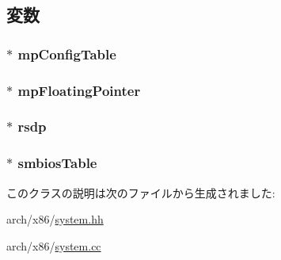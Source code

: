 \subsection{変数}
\hypertarget{classX86System_a9330926e79494dca3485ba60e2fe27d4}{
\subsubsection[{mpConfigTable}]{$\ast$ {\bf mpConfigTable}}}
\label{classX86System_a9330926e79494dca3485ba60e2fe27d4}
\hypertarget{classX86System_ae6f1d27ec00245a1760fbadd3c288f27}{
\subsubsection[{mpFloatingPointer}]{$\ast$ {\bf mpFloatingPointer}}}
\label{classX86System_ae6f1d27ec00245a1760fbadd3c288f27}
\hypertarget{classX86System_a267601a08962af9107c6f7c533d4461d}{
\subsubsection[{rsdp}]{$\ast$ {\bf rsdp}}}
\label{classX86System_a267601a08962af9107c6f7c533d4461d}
\hypertarget{classX86System_a5c04c44b233a4eb2f0b5257fbf325a16}{
\subsubsection[{smbiosTable}]{$\ast$ {\bf smbiosTable}}}
\label{classX86System_a5c04c44b233a4eb2f0b5257fbf325a16}


このクラスの説明は次のファイルから生成されました:\begin{DoxyCompactItemize}
\item 
arch/x86/\hyperlink{arch_2x86_2system_8hh}{system.hh}\item 
arch/x86/\hyperlink{arch_2x86_2system_8cc}{system.cc}\end{DoxyCompactItemize}
